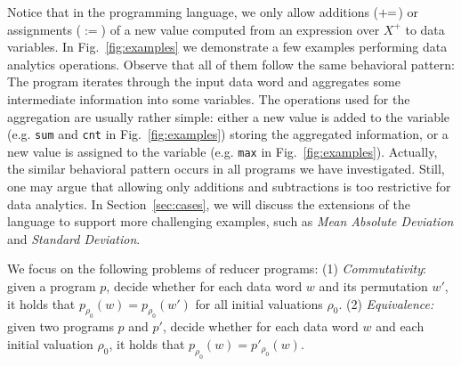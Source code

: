 Notice that in the programming language, we only allow additions ($+\!\!=$) or assignments ($:=$) of a new value computed from an expression over $X^+$ to data variables. 
In Fig.~\ref{fig:examples} we demonstrate a few examples performing data analytics operations. Observe that all of them follow the same behavioral pattern: The program iterates through the input data word and aggregates some intermediate information into some variables. The operations used for the aggregation are usually rather simple: either a new value is added to the variable (e.g. \texttt{sum} and \texttt{cnt} in Fig.~\ref{fig:examples}) storing the aggregated information, or a new value is assigned to the variable (e.g. \texttt{max} in Fig.~\ref{fig:examples}). Actually, the similar behavioral pattern occurs in all programs we have investigated.
Still, one may argue that allowing only additions and subtractions is too restrictive for data analytics. 
In Section~\ref{sec:cases}, we will discuss the extensions of the language to support more challenging examples, such as \emph{Mean Absolute Deviation} and \emph{Standard Deviation}.




 

We focus on the following problems of reducer programs: (1) \emph{Commutativity}: given a program $p$, decide whether for each data word $w$ and its permutation $w'$, it holds that $p_{\rho_0}(w) = p_{\rho_0}(w')$ for all initial valuations $\rho_0$. (2) \emph{Equivalence:} given two programs $p$ and $p'$, decide whether for each data word $w$ and each initial valuation $\rho_0$, it holds that $p_{\rho_0}(w)=p'_{\rho_0}(w)$.





